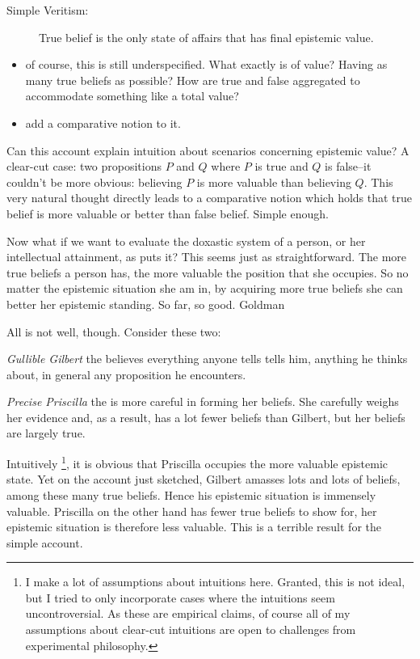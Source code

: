 \documentclass[12pt,numbers=noenddot]{scrartcl}
\begin{document}
\begin{description}
    \item[Simple Veritism:] True belief is the only state of affairs that has final epistemic value.
\end{description}

\begin{itemize}
    \item of course, this is still underspecified. What exactly is of value? Having as many true beliefs as possible? How are true and false aggregated to accommodate something like a total value?
    \item add a comparative notion to it.
\end{itemize}

Can this account explain intuition about scenarios concerning epistemic value?  A clear-cut case: two propositions $P$ and $Q$ where $P$ is true and $Q$ is false–it couldn't be more obvious: believing $P$ is more valuable than believing $Q$. This very natural thought directly leads to a comparative notion which holds that true belief is more valuable or better than false belief. Simple enough.

Now what if we want to evaluate the doxastic system of a person, or her intellectual attainment, as \textcite[58]{Goldman2002-GOLTUO-2} puts it? This seems just as straightforward. The more true beliefs a person has, the more valuable the position that she occupies. So no matter the epistemic situation she am in, by acquiring more true beliefs she can better her epistemic standing. So far, so good. Goldman\textcite[59]{Goldman2002-GOLTUO-2}

All is not well, though. Consider these two:
\begin{description}
    \item \emph{Gullible Gilbert} the believes everything anyone tells tells him, anything he thinks about, in general any proposition he encounters.
    \item \emph{Precise Priscilla} the is more careful in forming her beliefs. She carefully weighs her evidence and, as a result, has a lot fewer beliefs than Gilbert, but her beliefs are largely true.
\end{description}

Intuitively
\footnote{I make a lot of assumptions about intuitions here. Granted, this is not ideal, but I tried to only incorporate cases where the intuitions seem uncontroversial. As these are empirical claims, of course all of my assumptions about clear-cut intuitions are open to challenges from experimental philosophy.},
it is obvious that Priscilla occupies the more valuable epistemic state. Yet on the account just sketched, Gilbert amasses lots and lots of beliefs, among these many true beliefs. Hence his epistemic situation is immensely valuable. Priscilla on the other hand has fewer true beliefs to show for, her epistemic situation is therefore less valuable. This is a terrible result for the simple account.
\end{document}
